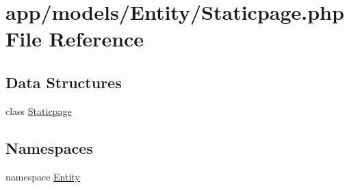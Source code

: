 \hypertarget{_staticpage_8php}{\section{app/models/\-Entity/\-Staticpage.php File Reference}
\label{_staticpage_8php}
}
\subsection*{Data Structures}
\begin{DoxyCompactItemize}
\item 
class \hyperlink{class_entity_1_1_staticpage}{Staticpage}
\end{DoxyCompactItemize}
\subsection*{Namespaces}
\begin{DoxyCompactItemize}
\item 
namespace \hyperlink{namespace_entity}{Entity}
\end{DoxyCompactItemize}
